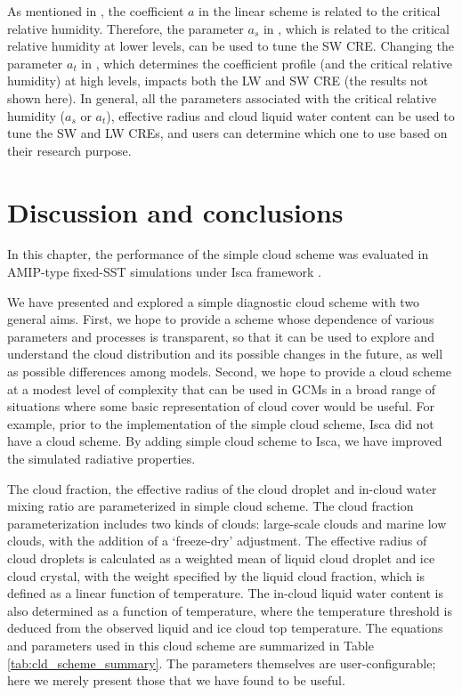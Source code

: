 As mentioned in , the coefficient $a$ in the linear scheme is related to the critical relative humidity. Therefore, the parameter $a_s$ in , which is related to the critical relative humidity at lower levels, can be used to tune the SW CRE. Changing the parameter $a_t$ in , which determines the coefficient profile (and the critical relative humidity) at high levels, impacts both the LW and SW CRE (the results not shown here). In general, all the parameters associated with the critical relative humidity ($a_s$ or $a_t$), effective radius and cloud liquid water content can be used to tune the SW and LW CREs, and users can determine which one to use based on their research purpose.

\section{Discussion and conclusions}

In this chapter, the performance of the simple cloud scheme was evaluated in AMIP-type fixed-SST simulations under Isca framework \citep{Vallis2018}.

We have presented and explored a simple diagnostic cloud scheme with two general aims. First, we hope to provide a scheme whose dependence of various parameters and processes is transparent, so that it can be used to explore and understand the cloud distribution and its possible changes in the future, as well as possible differences among models. Second, we hope to provide a cloud scheme at a modest level of complexity that can be used in GCMs in a broad range of situations where some basic representation of cloud cover would be useful. For example, prior to the implementation of the simple cloud scheme, Isca did not have a cloud scheme. By adding simple cloud scheme to Isca, we have improved the simulated radiative properties.

The cloud fraction, the effective radius of the cloud droplet and in-cloud water mixing ratio are parameterized in simple cloud scheme. The cloud fraction parameterization includes two kinds of clouds: large-scale clouds and marine low clouds, with the addition of a `freeze-dry' adjustment. The effective radius of cloud droplets is calculated as a weighted mean of liquid cloud droplet and ice cloud crystal, with the weight specified by the liquid cloud fraction, which is defined as a linear function of temperature. The in-cloud liquid water content is also determined as a function of temperature, where the temperature threshold is deduced from the observed liquid and ice cloud top temperature. The equations and parameters used in this cloud scheme are summarized in Table \ref{tab:cld_scheme_summary}. The parameters themselves are user-configurable; here we merely present those that we have found to be useful.


